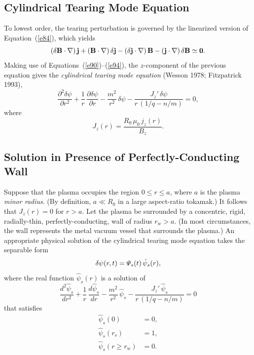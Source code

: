 \documentclass[notitlepage,12pt]{article}
\begin{document}
\subsection{Cylindrical Tearing Mode Equation}
To lowest order, the tearing perturbation is governed by the linearized version of Equation~(\ref{e84}), which yields
\begin{equation}\label{e96}
(\delta{\bf B}\cdot \nabla)\,{\bf j} + ({\bf B}\cdot\nabla)\,\delta{\bf j} - (\delta{\bf j}\cdot\nabla)\,{\bf B} - 
({\bf j}\cdot\nabla)\,\delta {\bf B}\simeq {\bf 0}.
\end{equation}
Making use of Equations~(\ref{e90})--(\ref{e94}), the $z$-component of the previous equation gives
the {\em cylindrical tearing mode equation}\/ (Wesson 1978; Fitzpatrick 1993),
\begin{equation}\label{e97}
\frac{\partial^2\delta\psi}{\partial r^2} + \frac{1}{r}\,\frac{\partial\delta\psi}{\partial r}-\frac{m^2}{r^2}\,\delta\psi - \frac{J_z'\,\delta\psi}{r\,(1/q-n/m)}=  0,
\end{equation}
where 
\begin{equation}
J_z(r)= \frac{R_0\,\mu_0\,j_z(r)}{B_z}.
\end{equation}

\subsection{Solution in Presence of Perfectly-Conducting Wall}\label{perfect}
Suppose that the plasma occupies the region $0\leq r\leq a$, where $a$ is the plasma {\em minor radius}. (By definition, $a\ll R_0$ in a large aspect-ratio tokamak.) It follows that
$J_z(r)=0$ for $r>a$. Let the plasma be surrounded by a concentric, rigid, radially-thin, perfectly-conducting, wall of radius $r_w>a$. 
(In most circumstances, the wall represents the metal vacuum vessel that surrounds  the plasma.) An appropriate
physical solution of the cylindrical tearing mode equation takes the separable form
\begin{equation}\label{e99}
\delta\psi(r,t)= {\mit\Psi}_s(t)\,\hat{\psi}_s(r),
\end{equation}
where the real function $\hat{\psi}_s(r)$ is a solution of 
\begin{equation}\label{e100}
\frac{d^2\hat{\psi}_s}{dr^2} + \frac{1}{r}\,\frac{d\hat{\psi}_s}{dr}-\frac{m^2}{r^2}\,\hat{\psi}_s - \frac{J_z'\,\hat{\psi}_s}{r\,(1/q-n/m)}= 0
\end{equation}
that satisfies
\begin{align}\label{e101}
\hat{\psi}_s(0) &= 0,\\[0.5ex]
\hat{\psi}_s(r_s) &= 1,\label{e102}\\[0.5ex]
\hat{\psi}_s(r\geq r_w) &= 0.\label{e103}
\end{align}
\end{document}
